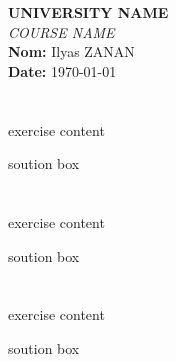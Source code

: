 \documentclass[12pt]{article}
\begin{document}
\begin{center}
	\Large\textbf{UNIVERSITY NAME} \\[1em]
	\large\textit{COURSE NAME} \\[2em]
	\normalsize
	\textbf{Nom:} Ilyas ZANAN \\[0.5em]
	\textbf{Date:} \today{}
\end{center}

\vspace{1cm}

\section{}
exercise content


\begin{correctionbox}
	soution box
\end{correctionbox}

\section{}
exercise content


\begin{correctionbox}
	soution box
\end{correctionbox}

\section{}
exercise content


\begin{correctionbox}
	soution box
\end{correctionbox}

\end{document}
